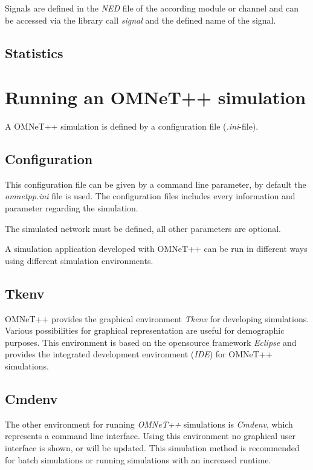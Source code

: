 Signals are defined in the \emph{NED} file of the according module or channel and can be accessed via the library call \emph{signal} and the defined name of the signal. %


\subsection{Statistics}
\label{sec:omnet_results_statistics}



\section{Running an OMNeT++ simulation}
\label{sec:omnet_running}
A OMNeT++ simulation is defined by a configuration file (\emph{.ini}-file).

\subsection{Configuration}
\label{sec:omnet_running_config}
This configuration file can be given by a command line parameter, by default the \emph{omnetpp.ini} file is used.
The configuration files includes every information and parameter regarding the simulation.

The simulated network must be defined, all other parameters are optional.



A simulation application developed with OMNeT++ can be run in different ways using different simulation environments.

\subsection{Tkenv}
\label{sec:omnet_running_tkenv}
OMNeT++ provides the graphical environment \emph{Tkenv} for developing simulations.
Various possibilities for graphical representation are useful for demographic purposes.
This environment is based on the opensource framework \emph{Eclipse} and provides the integrated development environment (\emph{IDE}) for OMNeT++ simulations.

\subsection{Cmdenv}
\label{sec:omnet_running_cmdenv}
The other environment for running \emph{OMNeT++} simulations is \emph{Cmdenv}, which represents a command line interface.
Using this environment no graphical user interface is shown, or will be updated.
This simulation method is recommended for batch simulations or running simulations with an increased runtime.
